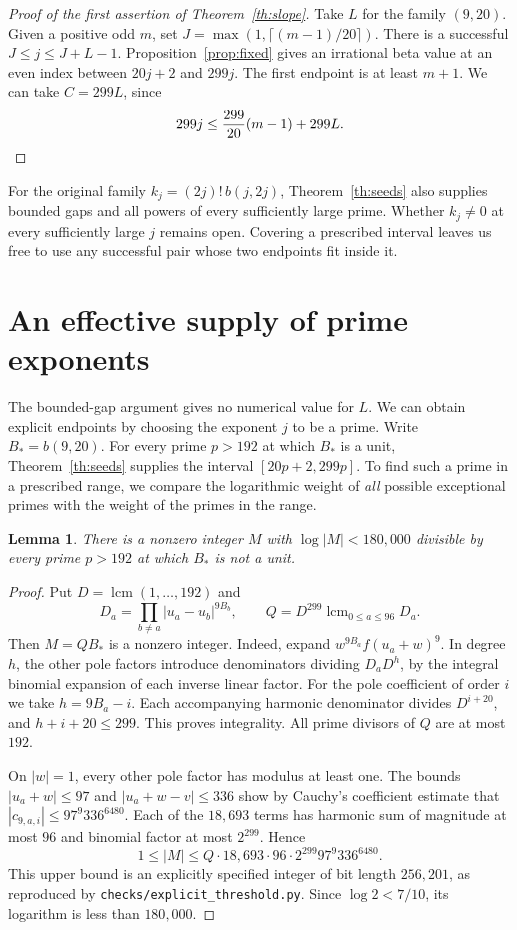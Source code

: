 \documentclass[11pt]{article}
\newtheorem{lemma}[theorem]{Lemma}
\numberwithin{equation}{section}
\DeclareMathOperator{\lcm}{lcm}
\begin{document}
\begin{proof}[Proof of the first assertion of Theorem~\ref{th:slope}]
Take \(L\) for the family \((9,20)\). Given a positive odd \(m\), set
\(J=\max(1,\lceil(m-1)/20\rceil)\). There is a successful
\(J\le j\le J+L-1\). Proposition~\ref{prop:fixed} gives an irrational
beta value at an even index between \(20j+2\) and \(299j\).
The first endpoint is at least \(m+1\). We can take \(C=299L\), since
\[
            299j\le \frac{299}{20}(m-1)+299L .\qedhere
\]
\end{proof}

For the original family \(k_j=(2j)!\,b(j,2j)\), Theorem~\ref{th:seeds}
also supplies bounded gaps and all powers of every sufficiently large
prime. Whether \(k_j\ne0\) at every sufficiently large \(j\) remains
open. Covering a prescribed interval leaves us free to use any
successful pair whose two endpoints fit inside it.

\section{An effective supply of prime exponents}\label{sec:effective}

The bounded-gap argument gives no numerical value for \(L\). We can
obtain explicit endpoints by choosing the exponent \(j\) to be a
prime. Write \(B_*=b(9,20)\). For every prime \(p>192\) at which
\(B_*\) is a unit, Theorem~\ref{th:seeds} supplies the interval
\([20p+2,299p]\). To find such a prime in a prescribed range, we
compare the logarithmic weight of \emph{all} possible exceptional
primes with the weight of the primes in the range.

\begin{lemma}\label{lem:height}
There is a nonzero integer \(M\) with \(\log|M|<180{,}000\) divisible
by every prime \(p>192\) at which \(B_*\) is not a unit.
\end{lemma}
\begin{proof}
Put \(D=\lcm(1,\dots,192)\) and
\[
 D_a=\prod_{b\ne a}|u_a-u_b|^{9B_b},\qquad
 Q=D^{299}\lcm_{0\le a\le96}D_a .
\]
Then \(M=QB_*\) is a nonzero integer. Indeed, expand
\(w^{9B_a}f(u_a+w)^9\). In degree \(h\), the other pole factors
introduce denominators dividing \(D_aD^h\), by the integral binomial
expansion of each inverse linear factor. For the pole coefficient of
order \(i\) we take \(h=9B_a-i\). Each accompanying harmonic
denominator divides \(D^{i+20}\), and \(h+i+20\le299\). This proves
integrality. All prime divisors of \(Q\) are at most \(192\).

On \(|w|=1\), every other pole factor has modulus at least one.
The bounds \(|u_a+w|\le97\) and \(|u_a+w-v|\le336\) show by Cauchy's
coefficient estimate that \(|c_{9,a,i}|\le97^9 336^{6480}\).
Each of the \(18{,}693\) terms has harmonic sum of magnitude at most
\(96\) and binomial factor at most \(2^{299}\). Hence
\[
      1\le |M|\le Q\cdot18{,}693\cdot96\cdot2^{299}97^9 336^{6480}.
\]
This upper bound is an explicitly specified integer of bit length
\(256{,}201\), as reproduced by \texttt{checks/explicit\_threshold.py}.
Since \(\log2<7/10\), its logarithm is less than \(180{,}000\).
\end{proof}
\end{document}

